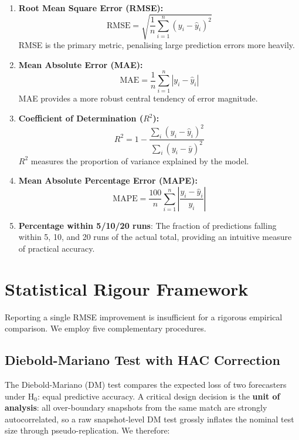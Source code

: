 \documentclass[12pt,a4paper,oneside]{report}
\begin{document}
\begin{enumerate}
    \item \textbf{Root Mean Square Error (RMSE):}
    \begin{equation}
    \text{RMSE} = \sqrt{\frac{1}{n}\sum_{i=1}^{n}(y_i - \hat{y}_i)^2}
    \end{equation}
    RMSE is the primary metric, penalising large prediction errors more heavily.

    \item \textbf{Mean Absolute Error (MAE):}
    \begin{equation}
    \text{MAE} = \frac{1}{n}\sum_{i=1}^{n}|y_i - \hat{y}_i|
    \end{equation}
    MAE provides a more robust central tendency of error magnitude.

    \item \textbf{Coefficient of Determination ($R^2$):}
    \begin{equation}
    R^2 = 1 - \frac{\sum_{i}(y_i - \hat{y}_i)^2}{\sum_{i}(y_i - \bar{y})^2}
    \end{equation}
    $R^2$ measures the proportion of variance explained by the model.

    \item \textbf{Mean Absolute Percentage Error (MAPE):}
    \begin{equation}
    \text{MAPE} = \frac{100}{n}\sum_{i=1}^{n}\left|\frac{y_i - \hat{y}_i}{y_i}\right|
    \end{equation}

    \item \textbf{Percentage within 5/10/20 runs}: The fraction of predictions falling within 5, 10, and 20 runs of the actual total, providing an intuitive measure of practical accuracy.
\end{enumerate}

\section{Statistical Rigour Framework}
\label{sec:stats}

Reporting a single RMSE improvement is insufficient for a rigorous empirical comparison.  We employ five complementary procedures.

\subsection{Diebold-Mariano Test with HAC Correction}

The Diebold-Mariano (DM) test \citep{diebold1995comparing} compares the expected loss of two forecasters under H$_0$: equal predictive accuracy.  A critical design decision is the \textbf{unit of analysis}: all over-boundary snapshots from the same match are strongly autocorrelated, so a raw snapshot-level DM test grossly inflates the nominal test size through pseudo-replication.  We therefore:
\end{document}
